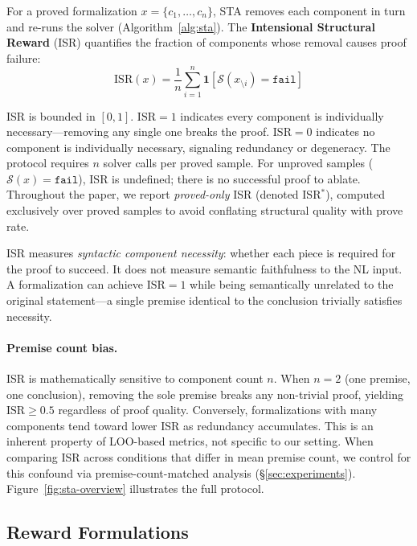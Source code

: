 For a proved formalization $x = \{c_1, \ldots, c_n\}$, STA removes each component in turn and re-runs the solver (Algorithm~\ref{alg:sta}).
The \textbf{Intensional Structural Reward} (ISR) quantifies the fraction of components whose removal causes proof failure:
\begin{equation}
  \text{ISR}(x) = \frac{1}{n} \sum_{i=1}^{n} \mathbf{1}\!\left[\mathcal{S}(x_{\setminus i}) = \texttt{fail}\right]
  \label{eq:isr}
\end{equation}

ISR is bounded in $[0, 1]$.
$\text{ISR} = 1$ indicates every component is individually necessary---removing any single one breaks the proof.
$\text{ISR} = 0$ indicates no component is individually necessary, signaling redundancy or degeneracy.
The protocol requires $n$ solver calls per proved sample.
For unproved samples ($\mathcal{S}(x) = \texttt{fail}$), ISR is undefined; there is no successful proof to ablate.
Throughout the paper, we report \emph{proved-only} ISR (denoted ISR$^*$), computed exclusively over proved samples to avoid conflating structural quality with prove rate.

ISR measures \emph{syntactic component necessity}: whether each piece is required for the proof to succeed.
It does not measure semantic faithfulness to the NL input.
A formalization can achieve $\text{ISR} = 1$ while being semantically unrelated to the original statement---a single premise identical to the conclusion trivially satisfies necessity.

\paragraph{Premise count bias.}
ISR is mathematically sensitive to component count $n$.
When $n = 2$ (one premise, one conclusion), removing the sole premise breaks any non-trivial proof, yielding $\text{ISR} \geq 0.5$ regardless of proof quality.
Conversely, formalizations with many components tend toward lower ISR as redundancy accumulates.
This is an inherent property of LOO-based metrics, not specific to our setting.
When comparing ISR across conditions that differ in mean premise count, we control for this confound via premise-count-matched analysis (\S\ref{sec:experiments}).
Figure~\ref{fig:sta-overview} illustrates the full protocol.

\subsection{Reward Formulations}
\label{sec:reward}

